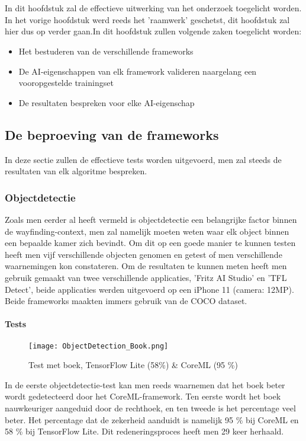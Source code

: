 \chapter{}
\label{ch:onderzoek}
In dit hoofdstuk zal de effectieve uitwerking van het onderzoek toegelicht worden. In het vorige hoofdstuk werd reeds het 'raamwerk' geschetst, dit hoofdstuk zal hier dus op verder gaan.In dit hoofdstuk zullen volgende zaken toegelicht worden:

\begin{itemize}
	\item Het bestuderen van de verschillende frameworks
	\item De AI-eigenschappen van elk framework valideren naargelang een vooropgestelde trainingset
	\item De resultaten bespreken voor elke AI-eigenschap
\end{itemize}

\section{De beproeving van de frameworks}
In deze sectie zullen de effectieve tests worden uitgevoerd, men zal steeds de resultaten van elk algoritme bespreken.

\subsection{Objectdetectie}

Zoals men eerder al heeft vermeld is objectdetectie een belangrijke factor binnen de wayfinding-context, men zal namelijk moeten weten waar elk object binnen een bepaalde kamer zich bevindt. Om dit op een goede manier te kunnen testen heeft men vijf verschillende objecten genomen en getest of men verschillende waarnemingen kon constateren. Om de resultaten te kunnen meten heeft men gebruik gemaakt van twee verschillende applicaties, 'Fritz AI Studio' en 'TFL Detect', beide applicaties werden uitgevoerd op een iPhone 11 (camera: 12MP). Beide frameworks maakten immers gebruik van de COCO dataset.


\subsubsection{Tests}
	\begin{figure}[H]
		\centering
		\texttt{[image: ObjectDetection\_Book.png]}
		\caption{Test met boek, TensorFlow Lite (58\%) \& CoreML (95 \%)}
	\end{figure}
In de eerste objectdetectie-test kan men reeds waarnemen dat het boek beter wordt gedetecteerd door het CoreML-framework. Ten eerste wordt het boek nauwkeuriger aangeduid door de rechthoek, en ten tweede is het percentage veel beter. Het percentage dat de zekerheid aanduidt is namelijk 95 \% bij CoreML en 58 \% bij TensorFlow Lite. Dit redeneringsproces heeft men 29 keer herhaald.

